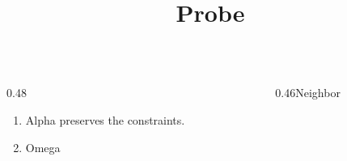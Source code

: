 \documentclass[9pt,aspectratio=43]{beamer}
\title{Probe}
\date{}
\begin{document}
\begin{frame}\begin{columns}[onlytextwidth,T]\begin{column}{0.48\textwidth}\begin{enumerate}\item<1-> Alpha preserves the constraints.\item<2-> \par Omega\end{enumerate}\end{column}\begin{column}{0.46\textwidth}Neighbor\end{column}\end{columns}\end{frame}
\end{document}

